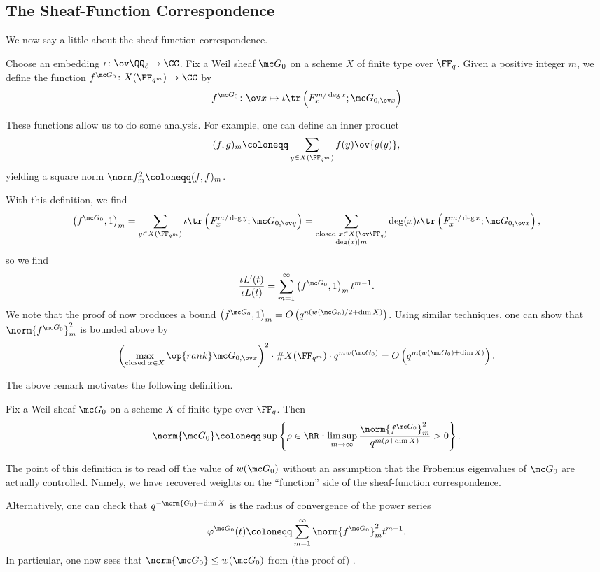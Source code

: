 \documentclass[../notes.tex]{subfiles}
\begin{document}
\subsection{The Sheaf-Function Correspondence}
We now say a little about the sheaf-function correspondence.
\begin{definition}
	Choose an embedding $\iota\colon\ov\QQ_\ell\to\CC$. Fix a Weil sheaf $\mc G_0$ on a scheme $X$ of finite type over $\FF_q$. Given a positive integer $m$, we define the function $f^{\mc G_0}\colon X(\FF_{q^m})\to\CC$ by
	\[f^{\mc G_0}\colon\ov x\mapsto\iota\tr\left(F_x^{m/\deg x};\mc G_{0,\ov x}\right)\]
\end{definition}
These functions allow us to do some analysis. For example, one can define an inner product
\[(f,g)_m\coloneqq\sum_{y\in X(\FF_{q^m})}f(y)\ov{g(y)},\]
yielding a square norm $\norm f_m^2\coloneqq(f,f)_m$.
\begin{remark}
	With this definition, we find
	\[\left(f^{\mc G_0},1\right)_m=\sum_{y\in X(\FF_{q^m})}\iota\tr\left(F_x^{m/\deg y};\mc G_{0,\ov y}\right)=\sum_{\substack{\text{closed }x\in X(\ov\FF_q)\\\deg (x)\mid m}}\deg(x)\iota\tr\left(F_x^{m/\deg x};\mc G_{0,\ov x}\right),\]
	so we find
	\[\frac{\iota L'(t)}{\iota L(t)}=\sum_{m=1}^\infty\left(f^{\mc G_0},1\right)_mt^{m-1}.\]
	We note that the proof of  now produces a bound $\left(f^{\mc G_0},1\right)_m=O\left(q^{n(w(\mc G_0)/2+\dim X)}\right)$. Using similar techniques, one can show that $\norm {f^{\mc G_0}}_m^2$ is bounded above by
	\[\left(\max_{\text{closed }x\in X}\op{rank}\mc G_{0,\ov x}\right)^2\cdot\#X(\FF_{q^m})\cdot q^{mw(\mc G_0)}=O\left(q^{m(w(\mc G_0)+\dim X)}\right).\]
\end{remark}
The above remark motivates the following definition.
\begin{definition}
	Fix a Weil sheaf $\mc G_0$ on a scheme $X$ of finite type over $\FF_q$. Then
	\[\norm{\mc G_0}\coloneqq\sup\left\{\rho\in\RR:\limsup_{m\to\infty}\frac{\norm{f^{\mc G_0}}_m^2}{q^{m(\rho+\dim X)}}>0\right\}.\]
\end{definition}
The point of this definition is to read off the value of $w(\mc G_0)$ without an assumption that the Frobenius eigenvalues of $\mc G_0$ are actually controlled. Namely, we have recovered weights on the ``function'' side of the sheaf-function correspondence.
\begin{remark}
	Alternatively, one can check that $q^{-\norm{G_0}-\dim X}$ is the radius of convergence of the power series
	\[\varphi^{\mc G_0}(t)\coloneqq\sum_{m=1}^\infty\norm{f^{\mc G_0}}_m^2t^{m-1}.\]
	In particular, one now sees that $\norm{\mc G_0}\le w(\mc G_0)$ from (the proof of) .
\end{remark}
\end{document}
